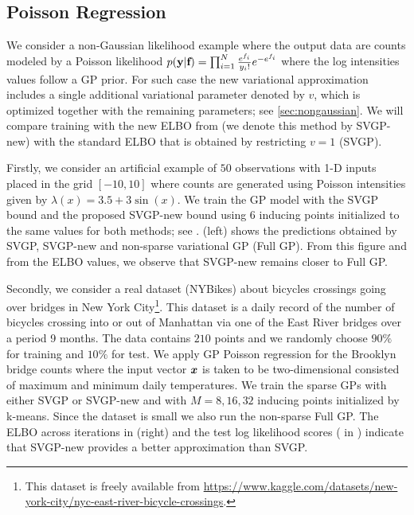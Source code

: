 \vspace{-1mm}

\subsection{Poisson Regression
  \label{sec:poisson}
}

\vspace{-1mm}

We consider a non-Gaussian likelihood example where the output data are counts modeled  by a Poisson likelihood 
$p(\textbf{y} | \textbf{f}) = \prod_{i=1}^N \frac{e^{f_i}}{y_i !} e^{-e^{f_i}}$  where the log intensities values follow a GP prior. For such 
case the new variational approximation includes a single additional variational parameter denoted by $v$, which is optimized together 
with the remaining parameters; see \cref{sec:nongaussian}. We will compare training with the new ELBO 
 from   (we denote this method by SVGP-new) with the standard ELBO that is obtained by restricting  $v=1$  (SVGP). 
 
Firstly, we consider an artificial example of $50$ observations with 1-D inputs placed in the grid $[-10, 10]$ where counts are
generated using Poisson intensities given by $\lambda(x) = 3.5 + 3  \sin(x)$. We train the GP model with the SVGP bound and the proposed SVGP-new bound using $6$ inducing points initialized to the same values for both methods; see . 
(left) shows the 
predictions obtained by SVGP, SVGP-new 
and non-sparse %
variational %
GP (Full GP). From
this figure and from the
ELBO values, 
we observe that SVGP-new
remains closer to Full GP.  

Secondly, we consider a real dataset (NYBikes) about bicycles crossings going over bridges in New York City\footnote{This dataset is freely available from
\url{https://www.kaggle.com/datasets/new-york-city/nyc-east-river-bicycle-crossings}.}.
This dataset is a daily record of the number of bicycles crossing into or out of Manhattan via one of the East River bridges over a period 9 months. The data contains $210$  points and we randomly choose $90\%$ for training and $10\%$ for test.   
We apply GP Poisson regression for the Brooklyn bridge counts where the input vector $\boldsymbol{x}$ is taken to be two-dimensional consisted of 
 maximum and minimum daily temperatures.  We train the sparse GPs with either SVGP or SVGP-new and with $M=8,16,32$ 
 inducing points initialized by k-means.  Since the dataset is small  we also run the non-sparse  Full GP. The ELBO across iterations in  (right) and the test log likelihood scores ( 
 in )
 indicate that  SVGP-new provides a better approximation than SVGP.  
 
  
   
   








